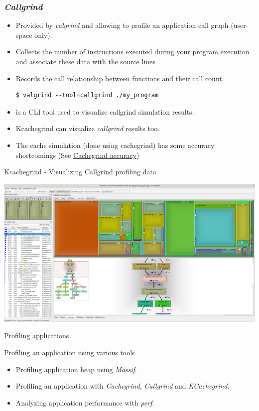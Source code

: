 \begin{frame}[fragile]
  \frametitle{{\em Callgrind}}
  \begin{itemize}
    \item Provided by {\em valgrind} and allowing to profile an application call graph
          (user-space only).
    \item Collects the number of instructions executed during your program
          execution and associate these data with the source lines
    \item Records the call relationship between functions and their call
          count.
  \begin{block}{}
    \begin{verbatim}
$ valgrind --tool=callgrind ./my_program
    \end{verbatim}
  \end{block}

  \item {} is a CLI tool used to visualize callgrind
        simulation results.
  \item Kcachegrind can visualize {\em callgrind} results too.
  \item The cache simulation (done using cachegrind) has some accuracy
        shortcomings (See \href{https://valgrind.org/docs/manual/cg-manual.html#cg-manual.annopts.accuracy}{Cachegrind accuracy})
  \end{itemize}
\end{frame}

\begin{frame}{Kcachegrind - Visualizing Callgrind profiling data}
  \begin{center}
    \includegraphics[height=0.8\textheight]{slides/debugging-application-profiling/kcachegrind_callgrind.png}
  \end{center}
\end{frame}

\setuplabframe
{Profiling applications}
{
  Profiling an application using various tools
  \begin{itemize}
    \item Profiling application heap using {\em Massif}.
    \item Profiling an application with {\em Cachegrind}, {\em Callgrind} and
          {\em KCachegrind}.
    \item Analyzing application performance with {\em perf}.
  \end{itemize}
}
